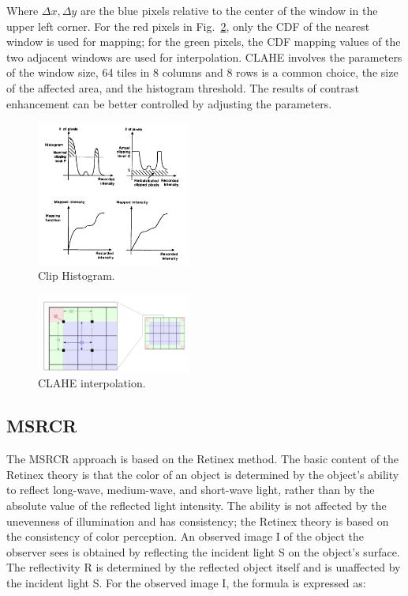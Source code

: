 \documentclass[conference]{IEEEtran}
\begin{document}
Where $\Delta x, \Delta y$ are the blue pixels relative to the center of the window in the upper left corner. For the red pixels in Fig.~\ref{fig2}, only the CDF of the nearest window is used for mapping; for the green pixels, the CDF mapping values of the two adjacent windows are used for interpolation. CLAHE involves the parameters of the window size, 64 tiles in 8 columns and 8 rows is a common choice\cite{4}, the size of the affected area, and the histogram threshold. The results of contrast enhancement can be better controlled by adjusting the parameters.

\begin{figure}[htbp]
\centerline{\includegraphics[width = 0.45\textwidth, height = 0.35\textwidth]{figure/CLAHE1.jpg}}
\caption{Clip Histogram\cite{3}.}
\label{fig1}
\end{figure}

\begin{figure}[htbp]
\centerline{\includegraphics[width = 0.45\textwidth]{figure/CLAHE2.jpg}}
\caption{CLAHE interpolation.}
\label{fig2}
\end{figure}

\subsection{MSRCR}
The MSRCR approach is based on the Retinex method. The basic content of the Retinex theory is that the color of an object is determined by the object's ability to reflect long-wave, medium-wave, and short-wave light, rather than by the absolute value of the reflected light intensity. The ability is not affected by the unevenness of illumination and has consistency; the Retinex theory is based on the consistency of color perception. An observed image I of the object the observer sees is obtained by reflecting the incident light S on the object's surface. The reflectivity R is determined by the reflected object itself and is unaffected by the incident light S. For the observed image I, the formula is expressed as:
\end{document}
